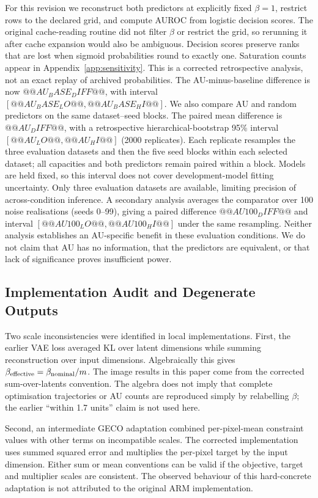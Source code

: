 For this revision we reconstruct both predictors at explicitly fixed
$\beta=1$, restrict rows to the declared grid, and compute AUROC from
logistic decision scores. The original cache-reading routine did not
filter $\beta$ or restrict the grid, so rerunning it after cache expansion
would also be ambiguous. Decision scores preserve ranks that are lost
when sigmoid probabilities round to exactly one. Saturation counts
appear in Appendix~\ref{app:sensitivity}. This is a corrected retrospective
analysis, not an exact replay of archived probabilities. The
AU-minus-baseline difference is now $@@AU_BASE_DIFF@@$, with interval
$[@@AU_BASE_LO@@,@@AU_BASE_HI@@]$. We also compare AU and random
predictors on the same dataset--seed blocks.
The paired mean difference is $@@AU_DIFF@@$, with a retrospective
hierarchical-bootstrap 95\% interval $[@@AU_LO@@,@@AU_HI@@]$ (2000
replicates). Each replicate resamples the three evaluation datasets and
then the five seed blocks within each selected dataset; all capacities
and both predictors remain paired within a block. Models are held fixed,
so this interval does not cover development-model fitting uncertainty.
Only three evaluation datasets are available, limiting precision of
across-condition inference. A secondary analysis averages the comparator
over 100 noise realisations (seeds 0--99), giving a paired difference
$@@AU100_DIFF@@$ and interval $[@@AU100_LO@@,@@AU100_HI@@]$ under the
same resampling. Neither analysis establishes an AU-specific benefit in
these evaluation conditions. We do not claim that AU has no information,
that the predictors are equivalent, or that lack of significance proves
insufficient power.

\subsection{Implementation Audit and Degenerate Outputs}
Two scale inconsistencies were identified in local implementations.
First, the earlier VAE loss averaged KL over latent dimensions while
summing reconstruction over input dimensions. Algebraically this gives
$\beta_{\rm effective}=\beta_{\rm nominal}/m$. The image results in
this paper come from the corrected sum-over-latents convention. The
algebra does not imply that complete optimisation trajectories or AU
counts are reproduced simply by relabelling $\beta$; the earlier
``within 1.7 units'' claim is not used here.

Second, an intermediate GECO adaptation combined per-pixel-mean
constraint values with other terms on incompatible scales. The corrected
implementation uses summed squared error and multiplies the per-pixel
target by the input dimension. Either sum or mean conventions can be
valid if the objective, target and multiplier scales are consistent.
The observed behaviour of this hard-concrete adaptation is not attributed
to the original ARM implementation.

